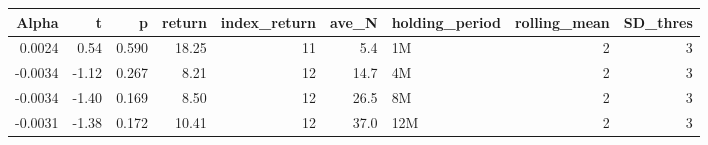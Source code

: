 \begin{table}[ht]
\centering
\begin{tabular}{rrrrrrlrr}
  \hline
Alpha & t & p & return & index\_return & ave\_N & holding\_period & rolling\_mean & SD\_thres \\ 
  \hline
0.0024 & 0.54 & 0.590 & 18.25 & 11 & 5.4 & 1M &  2 &  3 \\ 
  -0.0034 & -1.12 & 0.267 & 8.21 & 12 & 14.7 & 4M &  2 &  3 \\ 
  -0.0034 & -1.40 & 0.169 & 8.50 & 12 & 26.5 & 8M &  2 &  3 \\ 
  -0.0031 & -1.38 & 0.172 & 10.41 & 12 & 37.0 & 12M &  2 &  3 \\ 
   \hline
\end{tabular}
\end{table}

